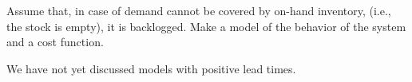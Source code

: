 \begin{exercise}
  Assume that, in case of demand cannot be covered by on-hand
  inventory, (i.e., the stock is empty), it is backlogged. Make a
  model of the behavior of the system and a cost function.

\end{exercise}


\begin{exercise}
  We have not yet discussed models with positive lead times. 

\end{exercise}



